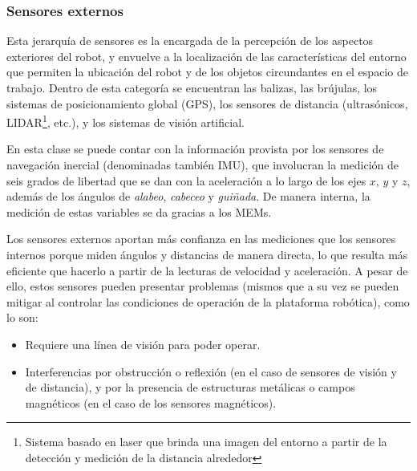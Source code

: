 \subsubsection{Sensores externos}
\label{sssec:se} 
Esta jerarquía de sensores es la encargada de la percepción de los aspectos exteriores del robot, y envuelve a la localización de las características del entorno que permiten la ubicación del robot y de los objetos circundantes en el espacio de trabajo. Dentro de esta categoría se encuentran las balizas, las brújulas, los sistemas de posicionamiento global (GPS), los sensores de distancia (ultrasónicos, LIDAR\footnote{Sistema basado en laser que brinda una imagen del entorno a partir de la detección y medición de la distancia alrededor}, etc.), y los sistemas de visión artificial.
\par En esta clase se puede contar con la información provista por los sensores de navegación inercial (denominadas también IMU), que involucran la medición de seis grados de libertad que se dan con la aceleración a lo largo de los ejes $x$, $y$ y $z$, además de los ángulos de \textit{alabeo}, \textit{cabeceo} y \textit{guiñada}. De manera interna, la medición de estas variables se da gracias a los MEMs.
\par Los sensores externos aportan más confianza en las mediciones que los sensores internos porque miden ángulos y distancias de manera directa, lo que resulta más eficiente que hacerlo a partir de la lecturas de velocidad y aceleración. A pesar de ello, estos sensores pueden presentar problemas (mismos que a su vez se pueden mitigar al controlar las condiciones de operación de la plataforma robótica), como lo son:
\begin{itemize}
	\item Requiere una línea de visión para poder operar.
	\item Interferencias por obstrucción o reflexión (en el caso de sensores de visión y de distancia), y por la presencia de estructuras metálicas o campos magnéticos (en el caso de los sensores magnéticos).
\end{itemize}
